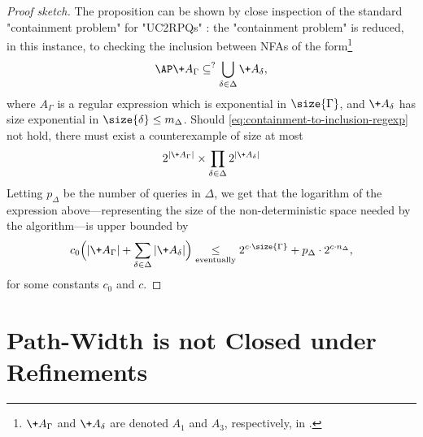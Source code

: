\begin{proof}[Proof sketch]
    The proposition can be shown by close inspection of the standard "containment problem" for "UC2RPQs" \cite[Theorem 5]{CalvaneseDeGiacomoLenzeriniVardi2000Containment}: the "containment problem" is reduced, in this instance, to checking the inclusion between NFAs of the form\footnote{$\+A_\Gamma$ and $\+A_\delta$ are denoted $A_1$ and $A_3$, respectively, in \cite{CalvaneseDeGiacomoLenzeriniVardi2000Containment}.}
	\begin{equation}
		\AP\label{eq:containment-to-inclusion-regexp}
		\+A_\Gamma \subseteq^? \bigcup_{\delta \in \Delta} \+A_\delta,
	\end{equation}
	where $A_\Gamma$ is a regular expression which is exponential in $\size{\Gamma}$,
	and $\+A_\delta$ has size exponential in $\size{\delta} \leq m_\Delta$.
	Should \eqref{eq:containment-to-inclusion-regexp} not hold, there must exist a counterexample of size at most 
	\[
		2^{|\+A_\Gamma|}\times \prod_{\delta \in \Delta} 2^{|\+A_\delta|}
	\]
	Letting $p_\Delta$ be the number
	of queries in $\Delta$, we get that the logarithm of the expression above---representing the
	size of the non-deterministic space needed by the algorithm---is upper bounded by
	\[
		c_0 \Bigl(|\+A_\Gamma| + \sum_{\delta \in \Delta} |\+A_\delta|\Bigr)
		\mathrel{\underset{\tiny\textrm{eventually}}{\leq}}
		2^{c\cdot \size{\Gamma}} + p_{\Delta} \cdot 2^{c\cdot n_\Delta},
	\]
	for some constants $c_0$ and $c$.
\end{proof}

\section{\AP{}Path-Width is not Closed under Refinements}
\label{apdx-sec:path-width-not-closed-refinements}

\pathwidthnotclosed*

